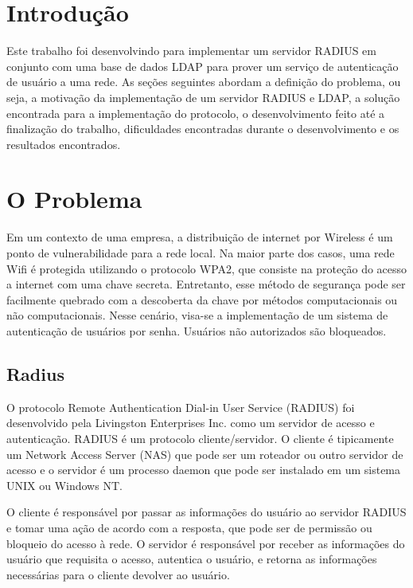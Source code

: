 \section{Introdução}

Este trabalho foi desenvolvindo para implementar um servidor RADIUS em conjunto com uma
base de dados LDAP para prover um serviço de autenticação de usuário a uma rede.
As seções seguintes abordam a definição do problema, ou seja, a motivação da implementação
de um servidor RADIUS e LDAP, a solução encontrada para a implementação do protocolo, o
desenvolvimento feito até a finalização do trabalho, dificuldades encontradas durante o
desenvolvimento e os resultados encontrados.


\section{O Problema}

Em um contexto de uma empresa, a distribuição de internet por Wireless é um ponto de
vulnerabilidade para a rede local. Na maior parte dos casos, uma rede Wifi é protegida
utilizando o protocolo WPA2, que consiste na proteção do acesso a internet com uma
chave secreta. Entretanto, esse método de segurança pode ser facilmente quebrado com
a descoberta da chave por métodos computacionais ou não computacionais. Nesse cenário,
visa-se a implementação de um sistema de autenticação de usuários por senha. Usuários
não autorizados são bloqueados.

\subsection{Radius}

O protocolo Remote Authentication Dial-in User Service (RADIUS) foi desenvolvido pela
Livingston Enterprises Inc. como um servidor de acesso e autenticação. RADIUS é um
protocolo cliente/servidor. O cliente é tipicamente um Network Access Server (NAS) que
pode ser um roteador ou outro servidor de acesso e o servidor é um processo daemon que
pode ser instalado em um sistema UNIX ou Windows NT.

O cliente é responsável por passar as informações do usuário ao servidor RADIUS e tomar
uma ação de acordo com a resposta, que pode ser de permissão ou bloqueio do acesso à rede.
O servidor é responsável por receber as informações do usuário que requisita o acesso,
autentica o usuário, e retorna as informações necessárias para o cliente devolver ao usuário.

